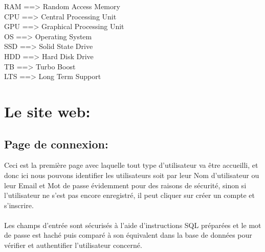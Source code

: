 \documentclass[12pt]{report}
\begin{document}
RAM \hspace{0.245in} ==> \hspace{0.22in} Random Access Memory
\\
CPU \hspace{0.3in} ==> \hspace{0.22in} Central Processing Unit
\\
GPU \hspace{0.3in} ==> \hspace{0.22in} Graphical Processing Unit
\\
OS  \hspace{0.42in} ==> \hspace{0.22in} Operating System
\\
SSD \hspace{0.33in} ==> \hspace{0.22in} Solid State Drive
\\
HDD \hspace{0.28in} ==> \hspace{0.22in} Hard Disk Drive
\\
TB  \hspace{0.43in} ==> \hspace{0.22in} Turbo Boost 
\\
LTS \hspace{0.365in} ==> \hspace{0.22in} Long Term Support

\newpage

\section{Le site web:}

\subsection{Page de connexion:}

\vspace{0.2in}

Ceci est la première page avec laquelle tout type d'utilisateur va être accueilli, et donc ici nous pouvons identifier les utilisateurs soit par leur Nom d'utilisateur ou leur Email et Mot de passe évidemment pour des raisons de sécurité, sinon si l'utilisateur ne s'est pas encore enregistré, il peut cliquer sur créer un compte et s'inscrire.
\\\\
Les champs d'entrée sont sécurisés à l'aide d'instructions SQL préparées et le mot de passe est haché puis comparé à son équivalent dans la base de données pour vérifier et authentifier l'utilisateur concerné.
\end{document}
